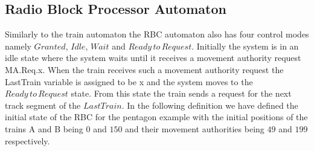 \subsection{Radio Block Processor Automaton}
Similarly to the train automaton the RBC automaton also has four control modes namely $Granted$, $Idle$, $Wait$ and $Ready \, to \, Request$. Initially the system is in an idle state where the system waits until it receives a movement authority request MA.Req.x. When the train receives such a movement authority request the LastTrain variable is assigned to be x and the system moves to the $Ready \, to \, Request$ state.  From this state the train sends a request for the next track segment of the $LastTrain$. In the following definition we have defined the initial state of the RBC for the pentagon example with the initial positions of the trains A and B being $0$ and $150$ and their movement authorities being $49$ and $199$ respectively.
\medskip

